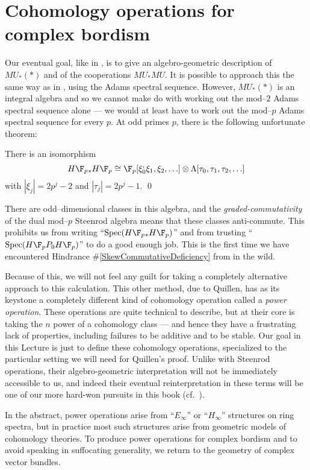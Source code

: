 \section{Cohomology operations for complex bordism}

Our eventual goal, like in , is to give an algebro-geometric description of $MU_*(*)$ and of the cooperations $MU_* MU$.  It is possible to approach this the same way as in , using the Adams spectral sequence.  However, $MU_*(*)$ is an integral algebra and so we cannot make do with working out the mod--$2$ Adams spectral sequence alone --- we would at least have to work out the mod--$p$ Adams spectral sequence for every $p$.  At odd primes $p$, there is the following unfortunate theorem:
\begin{theorem}
There is an isomorphism
\[H\F_p{}_* H\F_p \cong \F_p[\xi_0^, \xi_1, \xi_2, \ldots] \otimes \Lambda[\tau_0, \tau_1, \tau_2, \ldots]\]
with $|\xi_j| = 2p^j-2$ and $|\tau_j| = 2p^j - 1$. \qed
\end{theorem}
\noindent There are odd--dimensional classes in this algebra, and the \emph{graded-commutativity} of the dual mod--$p$ Steenrod algebra means that these classes anti-commute.  This prohibits us from writing ``$\Spec(H\F_p{}_* H\F_p)$'' and from trusting ``$\Spec(H\F_pP_0 H\F_p)$'' to do a good enough job.  This is the first time we have encountered Hindrance \#\ref{SkewCommutativeDeficiency} from  in the wild.

Because of this, we will not feel any guilt for taking a completely alternative approach to this calculation.  This other method, due to Quillen, has as its keystone a completely different kind of cohomology operation called a \textit{power operation}.  These operations are quite technical to describe, but at their core is taking the $n${\th} power of a cohomology class --- and hence they have a frustrating lack of properties, including failures to be additive and to be stable.  Our goal in this Lecture is just to define these cohomology operations, specialized to the particular setting we will need for Quillen's proof.  Unlike with Steenrod operations, their algebro-geometric interpretation will not be immediately accessible to us, and indeed their eventual reinterpretation in these terms will be one of our more hard-won pursuits in this book (cf.\ ).

In the abstract, power operations arise from ``$E_\infty$'' or ``$H_\infty$'' structures on ring spectra, but in practice most such structures arise from geometric models of cohomology theories.  To produce power operations for complex bordism and to avoid speaking in suffocating generality, we return to the geometry of complex vector bundles.


